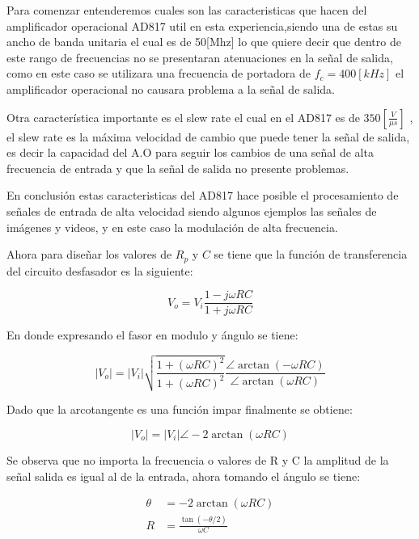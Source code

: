 \documentclass[letterpaper, titlepage]{article}
\providecommand{\abs}[1]{\lvert#1\rvert}
\begin{document}
\begin{enumerate}
		
Para comenzar entenderemos cuales son las caracteristicas que hacen del amplificador operacional AD817 util en esta experiencia,siendo una de estas su ancho de banda unitaria el cual es de 50[Mhz] lo que quiere decir que dentro de este rango de frecuencias no se presentaran atenuaciones en la señal de salida, como en este caso se utilizara una frecuencia de portadora de $f_{c} = 400[kHz]$ el amplificador operacional no causara problema a la señal de salida.

Otra característica importante es el slew rate el cual en el AD817 es de $350[\frac{V}{\mu s}]$ , el slew rate es la máxima velocidad de cambio que puede tener la señal de salida, es decir la capacidad del A.O para seguir los cambios de una señal de alta frecuencia de entrada y que la señal de salida no presente problemas.

En conclusión estas caracteristicas del AD817 hace posible el procesamiento de señales de entrada de alta velocidad siendo algunos ejemplos las señales de imágenes y videos, y en este caso la modulación de alta frecuencia.

Ahora para diseñar los valores de $ R_{p} $ y $C$ se tiene que la función de transferencia  del circuito desfasador es la siguiente:

\begin{equation}
V_{o} = V_{i} \frac{1- j \omega R C}{1 + j \omega R C}
\end{equation}
		
En donde expresando el fasor en modulo y ángulo se tiene:

\begin{equation*}
\abs{V_{o}}  = \abs{V_{i}} \sqrt{\frac{1 +( \omega R C)^2}{1 +( \omega R C)^2}} \frac{\angle \arctan(- \omega R C ) }{\angle \arctan(\omega R C )}
\end{equation*}

\newpage

Dado que la arcotangente es una función impar finalmente se obtiene:

\begin{equation}
\abs{V_{o}}  = \abs{V_{i}} \angle -2 \arctan (\omega R C)
\end{equation}
		
Se observa que no importa la frecuencia o valores de R y C la amplitud de la señal salida es igual al de la entrada, ahora tomando el ángulo se tiene:	

\begin{align*}
\theta & = -2 \arctan (\omega R C) \\
R & = \frac{\tan( -\theta/2)}{ \omega C }\\
\end{align*}


\end{enumerate}
\end{document}
